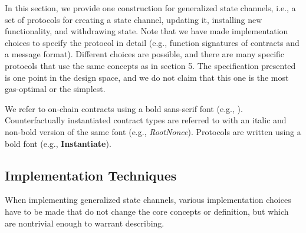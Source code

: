 \documentclass[prb,floatfix,reprint,nofootinbib,amsmath,amssymb,epsfig,pre,floats,letterpaper,groupedaffiliation,tightenlines,allcolors=blue,11pt]{revtex4}
\theoremstyle{definition}
\theoremstyle{definition}
\theoremstyle{definition}
\begin{document}
\newcommand{\rootnonce}{\textit{\textsf{RootNonce}}}
\newcommand{\paymentchannel}{\textit{\textsf{PaymentChannel}}}
\newcommand{\balancerefund}{\textit{\textsf{BalanceRefund}}}
\newcommand{\poker}{\textsf{\textit{Poker}}}
\newcommand{\proxycontract}{\textit{\textsf{ProxyContract}}}
\newcommand{\ProxyContract}{\textit{\textsf{ProxyContract}}}

\newcommand{\SignCommitment}{\textsf{\textbf{SignCommitment}}}
\newcommand{\Instantiate}{\textsf{\textbf{Instantiate}}}
\newcommand{\InstantiateWithExplicitOwners}{\textsf{\textbf{InstantiateWithExplicitOwners}}}
\newcommand{\CommitWithdrawal}{\textsf{\textbf{CommitWithdrawal}}}
\newcommand{\Update}{\textsf{\textbf{Update}}}


\renewcommand{\P}{\mathcal{P}}

In this section, we provide one construction for generalized state channels, i.e., a set of protocols for creating a state channel, updating it, installing new functionality, and withdrawing state. Note that we have made implementation choices to specify the protocol in detail (e.g., function signatures of contracts and a message format). Different choices are possible, and there are many specific protocols that use the same concepts as in section 5. The specification presented is one point in the design space, and we do not claim that this one is the most gas-optimal or the simplest.

We refer to on-chain contracts using a bold sans-serif font (e.g., \multisig). Counterfactually instantiated contract types are referred to with an italic and non-bold version of the same font (e.g., \textit{\textsf{RootNonce}}). Protocols are written using a bold font (e.g., \Instantiate).

\subsection{Implementation Techniques}

When implementing generalized state channels, various implementation choices have to be made that do not change the core concepts or definition, but which are nontrivial enough to warrant describing.
\end{document}
